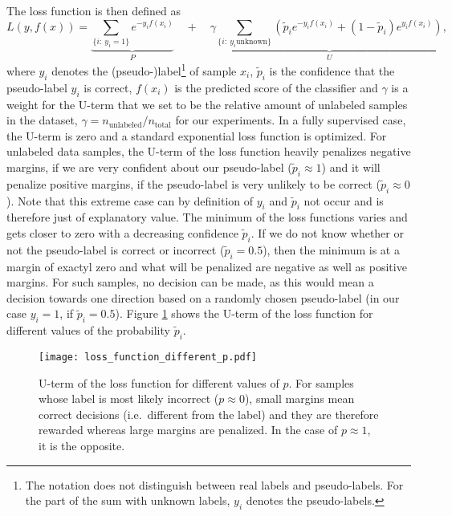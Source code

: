 The loss function is then defined as
\begin{equation*}
L(y,f(x)) = \underbrace{\sum_{\{i :~ y_i = 1\}} e^{-y_i f(x_i)}}_{P} \quad + \quad \gamma\underbrace{\sum_{\{i:~ y_i \text{unknown}\}} \left( \tilde p_i e^{-y_i f(x_i)} + (1-\tilde p_i) e^{y_i f(x_i)}\right)}_{U}, 
\end{equation*}
where $y_i$ denotes the (pseudo-)label\footnote{The notation does not distinguish between real labels and pseudo-labels. For the part of the sum with unknown labels, $y_i$ denotes the pseudo-labels.} of sample $x_i$, $\tilde p_i$ is the confidence that the pseudo-label $y_i$ is correct, $f(x_i)$ is the predicted score of the classifier and $\gamma$ is a weight for the U-term that we set to be the relative amount of unlabeled samples in the dataset, $\gamma = n_{\text{unlabeled}}/n_{\text{total}}$ for our experiments. 
In a fully supervised case, the U-term is zero and a standard exponential loss function is optimized. 
For unlabeled data samples, the U-term of the loss function heavily penalizes negative margins, if we are very confident about our pseudo-label ($\tilde p_i \approx 1$) and it will penalize positive margins, if the pseudo-label is very unlikely to be correct ($\tilde p_i \approx 0$). 
Note that this extreme case can by definition of $y_i$ and $\tilde p_i$ not occur and is therefore just of explanatory value. 
The minimum of the loss functions varies and gets closer to zero with a decreasing confidence $\tilde p_i$. If we do not know whether or not the pseudo-label is correct or incorrect ($\tilde p_i = 0.5$), then the minimum is at a margin of exactyl zero and what will be penalized are negative as well as positive margins. For such samples, no decision can be made, as this would mean a decision towards one direction based on a randomly chosen pseudo-label (in our case $y_i = 1$, if $\tilde p_i=0.5$). Figure \ref{fig:ourlossfunctionplot} shows the U-term of the loss function for different values of the probability $\tilde p_i$.

\begin{figure}[ht]
  \centering
  \texttt{[image: loss\_function\_different\_p.pdf]}	
  \caption{U-term of the loss function for different values of $p$. For samples whose label is most likely incorrect ($p \approx 0$), small margins mean correct decisions (i.e.\ different from the label) and they are therefore rewarded whereas large margins are penalized. In the case of $p \approx 1$, it is the opposite.}
  \label{fig:ourlossfunctionplot}
\end{figure}

